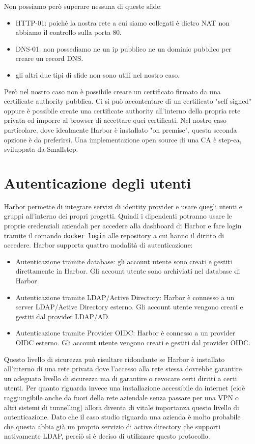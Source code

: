 \documentclass[12pt,a4paper]{report}
\begin{document}
Non possiamo però superare nessuna di queste sfide: 
\begin{itemize}
    \item HTTP-01: poiché la nostra rete a cui siamo collegati è dietro NAT non abbiamo il controllo sulla porta 80.
    \item DNS-01: non possediamo ne un ip pubblico ne un dominio pubblico per creare un record DNS.
    \item gli altri due tipi di sfide non sono utili nel nostro caso.
\end{itemize}
Però nel nostro caso non è possibile creare un certificato firmato da una certificate authority pubblica.
Ci si può accontentare di un certificato "self signed" oppure è possibile create una certificate authority all'interno della propria rete privata ed imporre al browser di accettare quei certificati. Nel nostro caso particolare, dove idealmente Harbor è installato "on premise", questa seconda opzione è da preferirsi. Una implementazione open source di una CA è step-ca, sviluppata da Smallstep.

\chapter{Autenticazione degli utenti}
Harbor permette di integrare servizi di identity provider e usare quegli utenti e gruppi all'interno dei propri progetti. Quindi i dipendenti potranno usare le proprie credenziali aziendali per accedere alla dashboard di Harbor e fare login tramite il comando \texttt{docker login} alle repository a cui hanno il diritto di accedere. Harbor supporta quattro modalità di autenticazione:
\begin{itemize}
    \item Autenticazione tramite database: gli account utente sono creati e gestiti direttamente in Harbor. Gli account utente sono archiviati nel database di Harbor.
    \item Autenticazione tramite LDAP/Active Directory: Harbor è connesso a un server LDAP/Active Directory esterno. Gli account utente vengono creati e gestiti dal provider LDAP/AD.
    \item Autenticazione tramite Provider OIDC: Harbor è connesso a un provider OIDC esterno. Gli account utente vengono creati e gestiti dal provider OIDC.
\end{itemize}
Questo livello di sicurezza può risultare ridondante se Harbor è installato all'interno di una rete privata dove l'accesso alla rete stessa dovrebbe garantire un adeguato livello di sicurezza ma di garantire o revocare certi diritti a certi utenti. Per quanto riguarda invece una installazione accessibile da internet (cioè raggiungibile anche da fuori della rete aziendale senza passare per una VPN o altri sistemi di tunnelling) allora diventa di vitale importanza questo livello di autenticazione.
Dato che il caso studio riguarda una azienda è molto probabile che questa abbia già un proprio servizio di active directory che supporti nativamente LDAP, perciò si è deciso di utilizzare questo protocollo.
\end{document}
